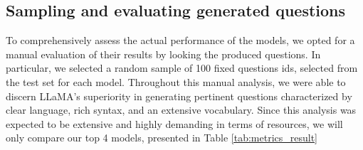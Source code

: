 \documentclass{article}
\begin{document}
\begin{table}[h]
\centering
{}
\caption{Experimental results of tested models on test set}
\label{tab:metrics_result}
\end{table}

\subsection{Sampling and evaluating generated questions}
To comprehensively assess the actual performance of the models, we opted for a manual evaluation of their results by looking the produced questions. In particular, we selected a random sample of 100 fixed questions ids, selected from the test set for each model. Throughout this manual analysis, we were able to discern LLaMA's superiority in generating pertinent questions characterized by clear language, rich syntax, and an extensive vocabulary. Since this analysis was expected to be extensive and highly demanding in terms of resources, we will only compare our top 4 models, presented in Table \ref{tab:metrics_result}
\end{document}
